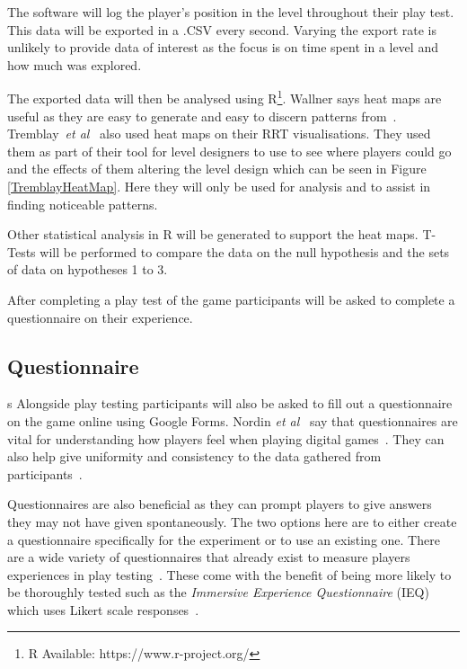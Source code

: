 \documentclass[journal]{IEEEtran}
\begin{document}
The software will log the player's position in the level throughout their play test. This data will be exported in a .CSV every second. Varying the export rate is unlikely to provide data of interest as the focus is on time spent in a level and how much was explored. 

The exported data will then be analysed using R\footnote[2]{R Available: https://www.r-project.org/}. Wallner says heat maps are useful as they are easy to generate and easy to discern patterns from~\cite{Wallner2015}.  Tremblay~\textit{et al}~\cite{Tremblay2014} also used heat maps on their RRT visualisations. They used them as part of their tool for level designers to use to see where players could go and the effects of them altering the level design which can be seen in Figure \ref{TremblayHeatMap}. Here they will only be used for analysis and to assist in finding noticeable patterns.

Other statistical analysis in R will be generated to support the heat maps. T-Tests will be performed to compare the data on the null hypothesis and the sets of data on hypotheses 1 to 3.
 
After completing a play test of the game participants will be asked to complete a questionnaire on their experience.

\subsection{Questionnaire} \label{Questionnaire}s
Alongside play testing participants will also be asked to fill out a questionnaire on the game online using Google Forms. Nordin \textit{et al}~\cite{nordin2014} say that questionnaires are vital for understanding how players feel when playing digital games~\cite{nordin2014,Denisova2016}. They can also help give uniformity and consistency to the data gathered from participants~\cite{Denisova2016}.

Questionnaires are also beneficial as they can prompt players to give answers they may not have given spontaneously. The two options here are to either create a questionnaire specifically for the experiment or to use an existing one. There are a wide variety of questionnaires that already exist to measure players experiences in play testing~\cite{nordin2014,Jennett2008}. These come with the benefit of being more likely to be thoroughly tested such as the \textit{Immersive Experience
Questionnaire} (IEQ) which uses Likert scale responses~\cite{nordin2014,Jennett2008}.
 
\end{document}
